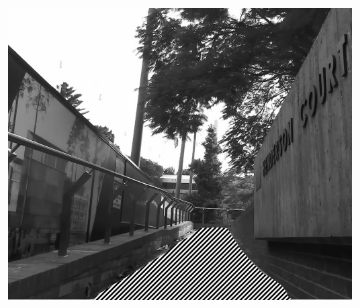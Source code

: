 \documentclass[10pt,twoside]{article}
\begin{document}
\setlength{\abovecaptionskip}{10pt}
\setlength{\belowcaptionskip}{0pt}
\begin{figure}[H]
    \centering
    \begin{subfigure}{.35\textwidth}
        \centering
        \includegraphics[width=\linewidth]{images/segmentation_gs.png}
    \end{subfigure}
    \quad
    \begin{subfigure}{.2\textwidth}
        \centering

\end{subfigure}
\end{figure}
\end{document}
